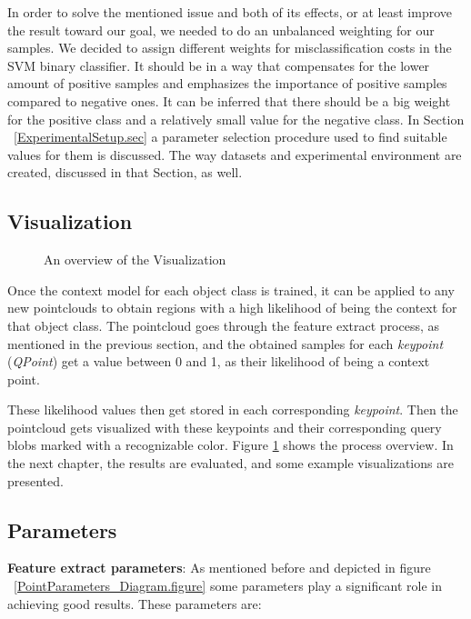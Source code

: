 In order to solve the mentioned issue and both of its effects, or at least improve the result toward our goal, we needed to do an unbalanced weighting for our samples. We decided to assign different weights for misclassification costs in the SVM binary classifier. It should be in a way that compensates for the lower amount of positive samples and emphasizes the importance of positive samples compared to negative ones. It can be inferred that there should be a big weight for the positive class and a relatively small value for the negative class. In Section ~\ref{ExperimentalSetup.sec} a parameter selection procedure used to find suitable values for them is discussed. The way datasets and experimental environment are created, discussed in that Section, as well.




\subsection{Visualization}
\label{visualization.ssec}

\begin{figure}[ht]
  \caption[Visualization Overview Flowchart]
  {An overview of the Visualization}
  \label{VisualizationFlowchart.figure}
\end{figure}

Once the context model for each object class is trained, it can be applied to any new pointclouds to obtain regions with a high likelihood of being the context for that object class. The pointcloud goes through the feature extract process, as mentioned in the previous section, and the obtained samples for each {\it keypoint} ({\it QPoint}) get a value between 0 and 1, as their likelihood of being a context point. 


These likelihood values then get stored in each corresponding {\it keypoint}. Then the pointcloud gets visualized with these keypoints and their corresponding query blobs marked with a recognizable color. Figure \ref{VisualizationFlowchart.figure} shows the process overview. 
In the next chapter, the results are evaluated, and some example visualizations are presented.


\subsection{Parameters}
\label{Parameters.ssec}

{\bf Feature extract parameters}:
As mentioned before and depicted in figure ~\ref{PointParameters_Diagram.figure} some parameters play a significant role in
achieving good results. 
These parameters are:

